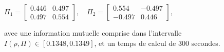 \documentclass[12pt,a4paper]{article}
\begin{document}
    $\Pi_1 = \begin{bmatrix} 0.446 & 0.497 \\ 0.497 & 0.554\end{bmatrix} , \quad \Pi_2 = \begin{bmatrix} 0.554 & -0.497 \\ -0.497 & 0.446\end{bmatrix},$
    
    avec une information mutuelle comprise dans l'intervalle $I(\rho, \Pi) \in [0.1348, 0.1349]$, et un temps de calcul de 300 secondes.

\end{document}
